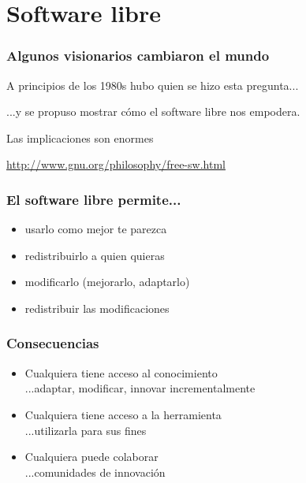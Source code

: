 \documentclass[17pt,aspectratio=169]{beamer}
\begin{document}
\section{Software libre}


\begin{frame}
\frametitle{Algunos visionarios cambiaron el mundo}

A principios de los 1980s hubo quien se hizo esta pregunta...

\vspace{.1cm}

...y se propuso mostrar cómo el software libre nos empodera.

\vspace{.1cm}

Las implicaciones son enormes

\begin{flushright}
{\small \url{http://www.gnu.org/philosophy/free-sw.html}}
\end{flushright}
\end{frame}


\begin{frame}
\frametitle{El software libre permite...}

{\large
\begin{itemize}
\item usarlo como mejor te parezca
\item redistribuirlo a quien quieras
\item modificarlo (mejorarlo, adaptarlo)
\item redistribuir las modificaciones
\end{itemize}
}
\end{frame}


\begin{frame}
\frametitle{Consecuencias}

\begin{itemize}
\item Cualquiera tiene acceso al conocimiento \\
  ...adaptar, modificar, innovar incrementalmente
\item Cualquiera tiene acceso a la herramienta \\
  ...utilizarla para sus fines
\item Cualquiera puede colaborar \\
  ...comunidades de innovación
\end{itemize}

\end{frame}
\end{document}
